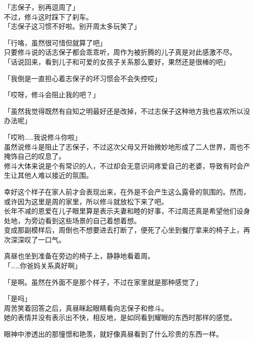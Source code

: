 「志保子，别再逗周了」\\

不过，修斗这时踩下了刹车。\\

「志保子这习惯不好啦。别开周太多玩笑了」

「行咯，虽然很可惜但就算了吧」\\

只要修斗说的话志保子都会乖乖听，周作为被折腾的儿子真是对此感激不尽。\\

「话说回来，看到儿子和可爱的女孩子关系那么要好，果然还是很棒的吧」

「我倒是一直担心着志保子的坏习惯会不会失控哎」

「哎呀，修斗会阻止我的吧？」

「虽然我觉得既然有自知之明最好还是改掉，不过志保子这种地方我也喜欢所以没办法呢」

「哎哟……我说修斗你啦」\\

虽然说修斗是阻止了志保子，不过这次父母又开始微妙地形成了二人世界，周也不掩饰自己的叹息了。\\

修斗大体来说是个有常识的人，不过却会无意识间疼爱自己的老婆，导致有时会产生让其他人难以接近的氛围。

幸好这个样子在家人前才会表现出来，在外是不会产生这么露骨的氛围的。然而，或许因为这里是周的家里，所以修斗就放松下来了吧。\\

长年不减的恩爱在儿子眼里算是表示夫妻和睦的好事，不过周还真是希望他们设身处地，为旁边看到这些场景的自己着想着想。\\

变成那副模样后，周倒也不想要进去打断了，便死了心坐到餐厅拿来的椅子上，再次深深叹了一口气。

真昼也坐到准备在旁边的椅子上，静静地看着周。\\

「……你爸妈关系真好啊」

「是啊。虽然在外面不是那个样子，不过在家里就是那种感觉了」

「是吗」\\

周苦笑着回答之后，真昼眯起眼睛看向志保子和修斗。\\

她的表情并没有表示出不快，相反地，是如同看到耀眼的东西时那样的感觉。

眼神中渗透出的那憧憬和艳羡，就好像真昼看到了什么珍贵的东西一样。\\

